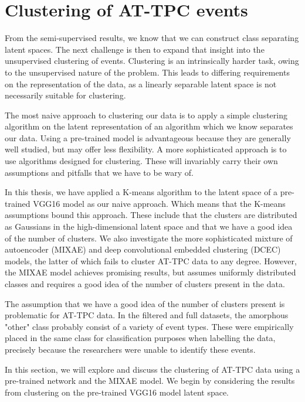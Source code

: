 \section{Clustering of AT-TPC events}

From the semi-supervised results, we know that we can construct class separating latent spaces. The next challenge is then to expand that insight into the unsupervised clustering of events. Clustering is an intrinsically harder task, owing to the unsupervised nature of the problem. This leads to differing requirements on the representation of the data, as a linearly separable latent space is not necessarily suitable for clustering. 

The most naive approach to clustering our data is to apply a simple clustering algorithm on the latent representation of an algorithm which we know separates our data. Using a pre-trained model is advantageous because they are generally well studied, but may offer less flexibility.  A more sophisticated approach is to use algorithms designed for clustering. These will invariably carry their own assumptions and pitfalls that we have to be wary of. 

In this thesis, we have applied a K-means algorithm to the latent space of a pre-trained VGG16 model as our naive approach. Which means that the K-means assumptions bound this approach. These include that the clusters are distributed as Gaussians in the high-dimensional latent space and that we have a good idea of the number of clusters. We also investigate the more sophisticated mixture of autoencoder (MIXAE) and deep convolutional embedded clustering (DCEC) models, the latter of which fails to cluster AT-TPC data to any degree. However, the MIXAE model achieves promising results, but assumes uniformly distributed classes and requires a good idea of the number of clusters present in the data.

The assumption that we have a good idea of the number of clusters present is problematic for AT-TPC data. In the filtered and full datasets, the amorphous "other" class probably consist of a variety of event types. These were empirically placed in the same class for classification purposes when labelling the data, precisely because the researchers were unable to identify these events.

In this section, we will explore and discuss the clustering of AT-TPC data using a pre-trained network and the MIXAE model. We begin by considering the results from clustering on the pre-trained VGG16 model latent space. 

